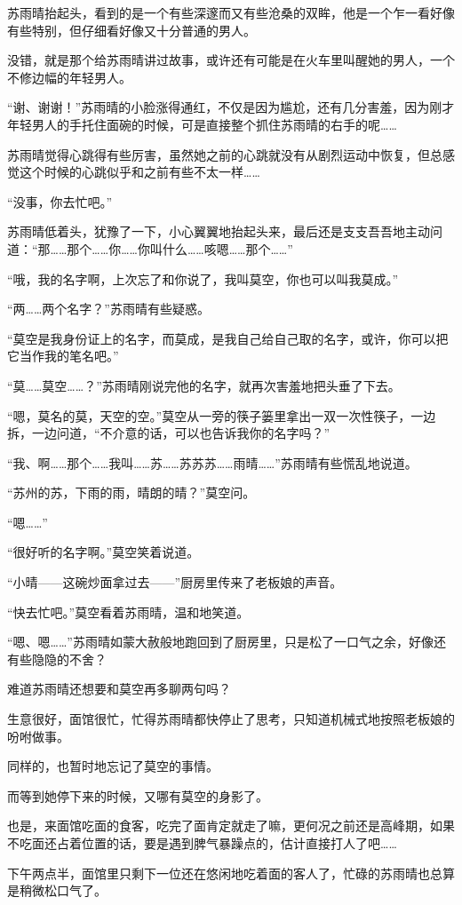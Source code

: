 苏雨晴抬起头，看到的是一个有些深邃而又有些沧桑的双眸，他是一个乍一看好像有些特别，但仔细看好像又十分普通的男人。

没错，就是那个给苏雨晴讲过故事，或许还有可能是在火车里叫醒她的男人，一个不修边幅的年轻男人。

“谢、谢谢！”苏雨晴的小脸涨得通红，不仅是因为尴尬，还有几分害羞，因为刚才年轻男人的手托住面碗的时候，可是直接整个抓住苏雨晴的右手的呢……

苏雨晴觉得心跳得有些厉害，虽然她之前的心跳就没有从剧烈运动中恢复，但总感觉这个时候的心跳似乎和之前有些不太一样……

“没事，你去忙吧。”

苏雨晴低着头，犹豫了一下，小心翼翼地抬起头来，最后还是支支吾吾地主动问道：“那……那个……你……你叫什么……咳嗯……那个……”

“哦，我的名字啊，上次忘了和你说了，我叫莫空，你也可以叫我莫成。”

“两……两个名字？”苏雨晴有些疑惑。

“莫空是我身份证上的名字，而莫成，是我自己给自己取的名字，或许，你可以把它当作我的笔名吧。”

“莫……莫空……？”苏雨晴刚说完他的名字，就再次害羞地把头垂了下去。

“嗯，莫名的莫，天空的空。”莫空从一旁的筷子篓里拿出一双一次性筷子，一边拆，一边问道，“不介意的话，可以也告诉我你的名字吗？”

“我、啊……那个……我叫……苏……苏苏苏……雨晴……”苏雨晴有些慌乱地说道。

“苏州的苏，下雨的雨，晴朗的晴？”莫空问。

“嗯……”

“很好听的名字啊。”莫空笑着说道。

“小晴——这碗炒面拿过去——”厨房里传来了老板娘的声音。

“快去忙吧。”莫空看着苏雨晴，温和地笑道。

“嗯、嗯……”苏雨晴如蒙大赦般地跑回到了厨房里，只是松了一口气之余，好像还有些隐隐的不舍？

难道苏雨晴还想要和莫空再多聊两句吗？

生意很好，面馆很忙，忙得苏雨晴都快停止了思考，只知道机械式地按照老板娘的吩咐做事。

同样的，也暂时地忘记了莫空的事情。

而等到她停下来的时候，又哪有莫空的身影了。

也是，来面馆吃面的食客，吃完了面肯定就走了嘛，更何况之前还是高峰期，如果不吃面还占着位置的话，要是遇到脾气暴躁点的，估计直接打人了吧……

下午两点半，面馆里只剩下一位还在悠闲地吃着面的客人了，忙碌的苏雨晴也总算是稍微松口气了。

